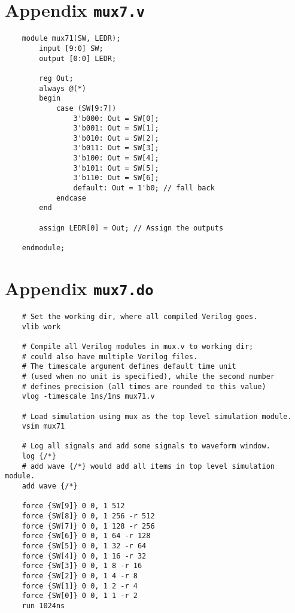 \documentclass[oneside, 10pt]{book}
\begin{document}
\section{Appendix \texttt{mux7.v}}
\begin{verbatim}
    module mux71(SW, LEDR);
        input [9:0] SW;
        output [0:0] LEDR;

        reg Out;
        always @(*)
        begin
            case (SW[9:7])
                3'b000: Out = SW[0];
                3'b001: Out = SW[1];
                3'b010: Out = SW[2];
                3'b011: Out = SW[3];
                3'b100: Out = SW[4];
                3'b101: Out = SW[5];
                3'b110: Out = SW[6];
                default: Out = 1'b0; // fall back
            endcase
        end
        
        assign LEDR[0] = Out; // Assign the outputs
        
    endmodule;
\end{verbatim}

\section{Appendix \texttt{mux7.do}}
\begin{verbatim}
    # Set the working dir, where all compiled Verilog goes.
    vlib work

    # Compile all Verilog modules in mux.v to working dir;
    # could also have multiple Verilog files.
    # The timescale argument defines default time unit
    # (used when no unit is specified), while the second number
    # defines precision (all times are rounded to this value)
    vlog -timescale 1ns/1ns mux71.v

    # Load simulation using mux as the top level simulation module.
    vsim mux71

    # Log all signals and add some signals to waveform window.
    log {/*}
    # add wave {/*} would add all items in top level simulation module.
    add wave {/*}

    force {SW[9]} 0 0, 1 512
    force {SW[8]} 0 0, 1 256 -r 512
    force {SW[7]} 0 0, 1 128 -r 256
    force {SW[6]} 0 0, 1 64 -r 128
    force {SW[5]} 0 0, 1 32 -r 64
    force {SW[4]} 0 0, 1 16 -r 32
    force {SW[3]} 0 0, 1 8 -r 16
    force {SW[2]} 0 0, 1 4 -r 8
    force {SW[1]} 0 0, 1 2 -r 4
    force {SW[0]} 0 0, 1 1 -r 2
    run 1024ns
\end{verbatim}
\end{document}
